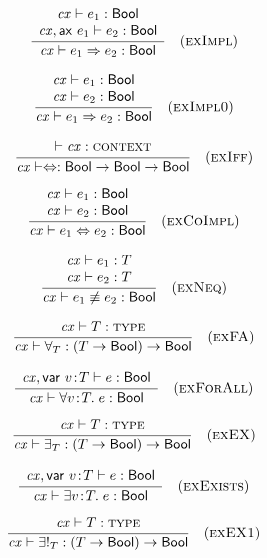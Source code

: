 \begin{theorem}\label{thm-eimpl}
{\rm
\[
\rruleII
 {\hastyO{\expr_1}{\bool}}
 {\hasty{\snoc{\cx}{\axM{\expr_1}}}{\expr_2}{\bool}}
 {\hastyO{\implO}{\bool}}
 {\Reimpl}
\]
}
\end{theorem}

\begin{theorem}\label{thm-eimplO}
{\rm
\[
\rruleII
 {\hastyO{\expr_1}{\bool}}
 {\hastyO{\expr_2}{\bool}}
 {\hastyO{\implO}{\bool}}
 {\ReimplO}
\]
}
\end{theorem}

\begin{theorem}\label{thm-eiff}
{\rm
\[
\rruleI
 {\cxwfO}
 {\hastyO{\iiffop}{\tarr{\bool}{\tarr{\bool}{\bool}}}}
 {\Reiff}
\]
}
\end{theorem}

\begin{theorem}\label{thm-ecoimpl}
{\rm
\[
\rruleII
 {\hastyO{\expr_1}{\bool}}
 {\hastyO{\expr_2}{\bool}}
 {\hastyO{\iiffO}{\bool}}
 {\Recoimpl}
\]
}
\end{theorem}

\begin{theorem}\label{thm-eneq}
{\rm
\[
\rruleII
 {\hastyO{\expr_1}{\typ}}
 {\hastyO{\expr_2}{\typ}}
 {\hastyO{\neeqO}{\bool}}
 {\Reneq}
\]
}
\end{theorem}

\begin{theorem}\label{thm-efaop}
{\rm
\[
\rruleI
 {\istyO{\typ}}
 {\hastyO{\faopO}{\tarr{(\tarr{\typ}{\bool})}{\bool}}}
 {\Refaop}
\]
}
\end{theorem}

\begin{theorem}\label{thm-efa}
{\rm
\[
\rruleI
 {\hasty{\snoc{\cx}{\vdecO}}{\expr}{\bool}}
 {\hastyO{\faO}{\bool}}
 {\Refa}
\]
}
\end{theorem}

\begin{theorem}\label{thm-eexop}
{\rm
\[
\rruleI
 {\istyO{\typ}}
 {\hastyO{\exopO}{\tarr{(\tarr{\typ}{\bool})}{\bool}}}
 {\Reexop}
\]
}
\end{theorem}

\begin{theorem}\label{thm-eex}
{\rm
\[
\rruleI
 {\hasty{\snoc{\cx}{\vdecO}}{\expr}{\bool}}
 {\hastyO{\exO}{\bool}}
 {\Reex}
\]
}
\end{theorem}

\begin{theorem}\label{thm-eexIop}
{\rm
\[
\rruleI
 {\istyO{\typ}}
 {\hastyO{\exIopO}{\tarr{(\tarr{\typ}{\bool})}{\bool}}}
 {\ReexIop}
\]
}
\end{theorem}

